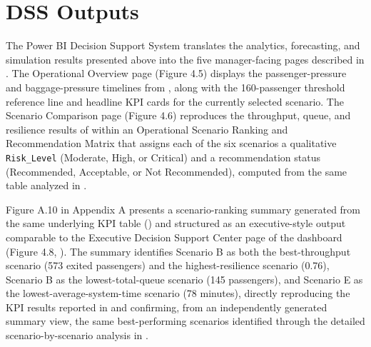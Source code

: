 \section{DSS Outputs}
\label{sec:dss-outputs}

The Power BI Decision Support System translates the analytics, forecasting, and simulation results presented above into the five manager-facing pages described in . The Operational Overview page (Figure 4.5) displays the passenger-pressure and baggage-pressure timelines from , along with the 160-passenger threshold reference line and headline KPI cards for the currently selected scenario. The Scenario Comparison page (Figure 4.6) reproduces the throughput, queue, and resilience results of  within an Operational Scenario Ranking and Recommendation Matrix that assigns each of the six scenarios a qualitative \nolinkurl{Risk_Level} (Moderate, High, or Critical) and a recommendation status (Recommended, Acceptable, or Not Recommended), computed from the same  table analyzed in .

Figure A.10 in Appendix A presents a scenario-ranking summary generated from the same underlying KPI table () and structured as an executive-style output comparable to the Executive Decision Support Center page of the dashboard (Figure 4.8, ). The summary identifies Scenario B as both the best-throughput scenario (573 exited passengers) and the highest-resilience scenario (0.76), Scenario B as the lowest-total-queue scenario (145 passengers), and Scenario E as the lowest-average-system-time scenario (78 minutes), directly reproducing the KPI results reported in  and confirming, from an independently generated summary view, the same best-performing scenarios identified through the detailed scenario-by-scenario analysis in .

